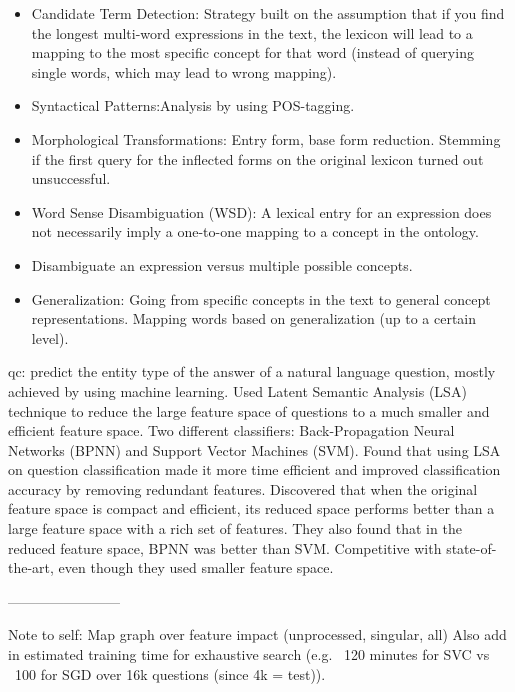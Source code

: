 \begin{itemize}
	\item Candidate Term Detection: Strategy built on the assumption that if you find the longest multi-word expressions in the text, 
	the lexicon will lead to a mapping to the most specific concept for that word (instead of querying single words, which may lead to wrong mapping).
	\item Syntactical Patterns:Analysis by using POS-tagging.
	\item Morphological Transformations: Entry form, base form reduction. 
	Stemming if the first query for the inflected forms on the original lexicon turned out unsuccessful.
	\item Word Sense Disambiguation (WSD): A lexical entry for an expression does not necessarily imply a one-to-one mapping to a concept in the ontology. 
	\item Disambiguate an expression versus multiple possible concepts.
	\item Generalization: Going from specific concepts in the text to general concept representations. Mapping words based on generalization (up to a certain level).
\end{itemize}
\cite{Bloehdorn2004}

\gls{qc}: predict the entity type of the answer of a natural language question, mostly achieved by using machine learning. 
Used Latent Semantic Analysis (LSA) technique to reduce the large feature space of questions to a much smaller and efficient feature space. 
Two different classifiers: Back-Propagation Neural Networks (BPNN) and Support Vector Machines (SVM). 
Found that using LSA on question classification made it more time efficient and improved classification accuracy by removing redundant features. 
Discovered that when the original feature space is compact and efficient, its reduced space performs better than a large feature space with a rich set of features. 
They also found that in the reduced feature space, BPNN was better than SVM.  
Competitive with state-of-the-art, even though they used smaller feature space.
\cite{Loni2011}

------------------------

Note to self: Map graph over feature impact (unprocessed, singular, all)
Also add in estimated training time for exhaustive search (e.g. ~120 minutes for SVC vs ~100 for SGD over 16k questions (since 4k = test)). 


\begin{comment}
I can either use \verb|\cite{ChangLin2011}| and get: \cite{ChangLin2011}. \\
Or I can use \verb|\textcite{ChangLin2011}| and get: \textcite{ChangLin2011}. \\
\verb|\cite| is based on \verb|\renewcommand*{\cite}{\autocite}|, \\
and \verb|\textcite| is based on \verb|\newcommand{\textcite}{\textcite}|. \\
Unfortunately, you can't get the year, but at least you can now get in-text citation. 
\end{comment}



